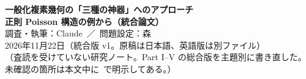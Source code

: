 

\sloppy
\begin{center}
{\LARGE\bfseries\sffamily 一般化複素幾何の「三種の神器」へのアプローチ}\\[6pt]
{\Large\bfseries\sffamily 正則 Poisson 構造の例から（統合論文）}\\[12pt]
{\large 調査・執筆：Claude\ ／\ 問題設定：森}\\[3pt]
2026年11月22日（統合版 v1。原稿は日本語、英語版は別ファイル）\\[3pt]
{\small （査読を受けていない研究ノート。Part I--V の総合版を主題別に書き直した。\\未確認の箇所は本文中に\tQ\ で明示してある。）}
\end{center}
\begin{abstract}\noindent
複素幾何の三種の神器（Riemann--Roch、Serre 消滅、Kodaira 埋め込み）の一般化複素幾何版を、最も簡単な非自明な例（正則 Poisson 構造 $\sigma$ の $\beta$-変換で得る、型が跳ぶ一般化複素構造と、その上の一般化正則直線束 $L$）から調べる。
(1) 一般化正則構造は Poisson 加群であり、$\sigma$ が対数シンプレクティックなら平坦な対数接続で、留数 $r_i$ が定数になる。
(2) Serre 型の消滅は横断次数での消滅として成り立ち、全次数では成り立たない。双対性 $\HH^k(L)^*\cong\HH^{2n-k}(L^\vee\otimes K^2)$ が任意次元で成り立つ。
(3) 全 Euler 標数は $(-1)^n\rk(E)\chi(X)$ で $c_1$ に依らない。曲面・トーリックでは Poincar\'e 多項式を留数で書き下し、準斉次な特異点の局所公式を証明した。
(4) 一般次元は簡約定理により商複体の条件に帰着し、留数が非整数なら $H^k(U;L_U)=0\ (k\ne n)$ を示した。
(5) 正則型では次数ごとに $m$ の多項式、対数シンプレクティック型では周期的となる。
(6) Kodaira 型では、一般化正則切断による埋め込みは不可能であり、葉空間版とトーリックの Poisson--Kodaira を示した。
指数定理（重み付き b-計算）の一般化は予想にとどまり、一般の Poisson--Kodaira は未解決である。
\end{abstract}
\tableofcontents
\clearpage












